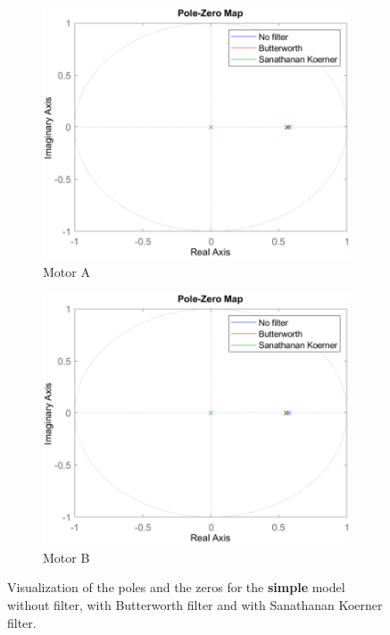 \documentclass[a4paper,kul]{kulakarticle} %
\begin{document}
\begin{figure}[htp!]
	\centering
	\begin{subfigure}[b]{0.48\textwidth}
		\centering
		\includegraphics[width=\textwidth]{p&z_simple_all_A_cropped.pdf}
		\caption{Motor A}
	\end{subfigure}
	\hfill
	\begin{subfigure}[b]{0.48\textwidth}  
		\centering 
		\includegraphics[width=\textwidth]{p&z_simple_all_B_cropped.pdf}
		\caption{Motor B}
	\end{subfigure}
	\caption[Pole-Zero map simple model]{Visualization of the poles and the zeros for the \textbf{simple} model without filter, with Butterworth filter and with Sanathanan Koerner filter.} 
	\label{fig:pz_simple_all}
\end{figure}
\end{document}
